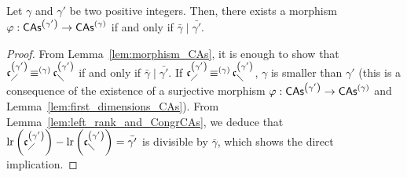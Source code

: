 \begin{Proposition} \label{prop:division_CAs}
    Let $\gamma$ and $\gamma'$ be two positive integers. Then, there
    exists a morphism $\varphi:\mathsf{CAs}^{\left(\gamma'\right)} \to \mathsf{CAs}^{\left(\gamma\right)}$ if and
    only if $\bar{\gamma} \mid \bar{\gamma'}$.
\end{Proposition}

\begin{proof}
    From Lemma~\ref{lem:morphism_CAs}, it is enough to show that
    $\mathfrak{c}^{\left(\gamma'\right)}_{\diagup} \operatorname{\equiv}^{(\gamma)} \mathfrak{c}^{\left(\gamma'\right)}_{\diagdown}$ if and only if
    $\bar{\gamma} \mid \bar{\gamma'}$. If
    $\mathfrak{c}^{\left(\gamma'\right)}_{\diagup}\operatorname{\equiv}^{(\gamma)}\mathfrak{c}^{\left(\gamma'\right)}_{\diagdown}$, $\gamma$ is
    smaller than $\gamma'$ (this is a consequence of the existence of a
    surjective morphism $\varphi:\mathsf{CAs}^{\left(\gamma'\right)} \to \mathsf{CAs}^{\left(\gamma\right)}$ and
    Lemma~\ref{lem:first_dimensions_CAs}). From
    Lemma~\ref{lem:left_rank_and_CongrCAs}, we deduce that
    \begin{math}
        \mathrm{lr}\left(\mathfrak{c}^{\left(\gamma'\right)}_{\diagup}\right)
        - \mathrm{lr}\left(\mathfrak{c}^{\left(\gamma'\right)}_{\diagdown}\right)
        = \bar{\gamma'}
    \end{math}
    is divisible by $\bar{\gamma}$, which shows the direct implication.
    \smallbreak


\end{proof}
